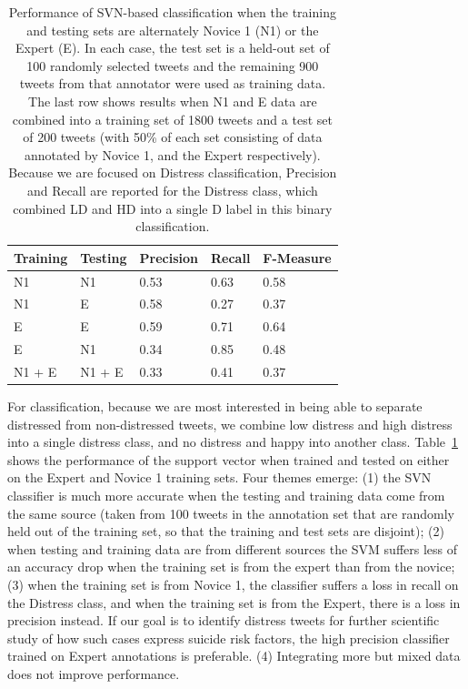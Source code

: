 \documentclass[11pt]{article}
\begin{document}
\begin{table}[h]
\small
\begin{tabular}{|l|l|l|l|l|}
\hline
Training         & Testing         & Precision & Recall & F-Measure \\ \hline
N1          & N1          & 0.53      & 0.63   & 0.58      \\ \hline
N1          & E & 0.58       & 0.27   & 0.37       \\ \hline
E           & E     & 0.59      & 0.71   & 0.64      \\ \hline
E            & N1          & 0.34      & 0.85   & 0.48      \\ \hline
N1 + E & N1 + E & 0.33      & 0.41   &  0.37         \\ \hline
\end{tabular}
\caption{Performance of SVN-based classification when the training and testing sets are alternately Novice 1 (N1) or the Expert (E). In each case,  the test set is a held-out set of 100 randomly selected tweets and the remaining 900 tweets from that annotator were used as training data. The last row shows results when N1 and E data are combined into a training set of 1800 tweets and a test set of 200 tweets (with 50\% of each set consisting of data annotated by Novice 1, and the Expert respectively). Because we are focused on Distress classification, Precision and Recall are reported for the Distress class, which combined LD and HD into a single D label in this binary classification.}
\label{tab:svm}
\end{table}


For classification, because we are most interested in being able to separate distressed from non-distressed tweets, we combine low distress and high distress into a single distress class, and no distress and happy into another class. Table~\ref{tab:svm} shows the performance of the support vector when trained and tested on either on the Expert and Novice 1 training sets. Four themes emerge: (1) the SVN classifier is much more accurate when the testing and training data come from the same source (taken from 100 tweets in the annotation set that are randomly held out of the training set, so that the training and test sets are disjoint); (2) when testing and training data are from different sources the SVM suffers less of an accuracy drop when the training set is from the expert than from the novice; (3) when the training set is from Novice 1, the classifier suffers a loss in recall on the Distress class, and when the training set is from the Expert, there is a loss in precision instead. If our goal is to identify distress tweets for further scientific study of how such cases express suicide risk factors, the high precision classifier trained on Expert annotations is preferable. (4) Integrating more but mixed data does not improve performance.
\end{document}
